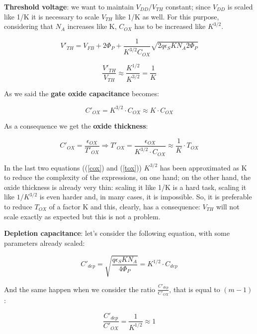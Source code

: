 \documentclass[a4paper, 12pt, twoside, openright]{report}
\begin{document}
\begin{enumerate}
\textbf{Threshold voltage}: we want to maintain $V_{DD}/V_{TH}$ constant; since $V_{DD}$ is scaled like 1/K it is necessary to scale $V_{TH}$ like 1/K as well. For this purpose, considering that $N_{A}$ increases like K, $C_{OX}$ has to be increased like $K^{3/2}$.

	\begin{equation}
	V'_{TH} = V_{FB} + 2\Phi_P + \frac{1}{K^{3/2} C_{OX}} \sqrt{2q \epsilon_S K N_A 2\Phi_P}
	\end{equation}
	
	\begin{equation}
	\frac{V'_{TH}}{V_{TH}} \approx \frac{K^{1/2}} {K^{3/2}} = \frac{1}{K}
	\end{equation}

As we said the \textbf{gate oxide capacitance} becomes:

	\begin{equation}
	C'_{OX} = K^{3/2} \cdot C_{OX}  \approx K \cdot C_{OX}
	\label{cox}
	\end{equation}

As a consequence we get the \textbf{oxide thickness}:

	\begin{equation}
	C'_{OX} = \frac{\epsilon_{OX}}{T'_{OX}} \Rightarrow T'_{OX} = \frac{\epsilon_{OX}}{K^{3/2} \cdot C_{OX}} \approx \frac{1}{K} \cdot T_{OX}
	\label{tox}
	\end{equation}

In the last two equations ((\ref{cox}) and (\ref{tox})) $K^{3/2}$ has been approximated as K to reduce the complexity of the expressions, on one hand; on the other hand, the oxide thickness is already very thin: scaling it like 1/K is a hard task, scaling it like $1/K^{3/2}$ is even harder and, in many cases, it is impossible. So, it is preferable to reduce $T_{OX}$ of a factor K and this, clearly, has a consequence: $V_{TH}$ will not scale exactly as expected but this is not a problem.

\textbf{Depletion capacitance}: let's consider the following equation, with some parameters already scaled:

	\begin{equation}
	C'_{dep} = \sqrt{\frac{q \epsilon_S K N_A}{4 \Phi_P}} = K^{1/2} \cdot C_{dep} 
	\label{}
	\end{equation}

And the same happen when we consider the ratio $\frac{C'_{dep}}{C'_{OX}}$, that is equal to $(m - 1)$:

	\begin{equation}
	\frac{C'_{dep}}{C'_{OX}} = \frac{1}{K^{1/2}} \approx 1
	\label{}
	\end{equation}


\end{enumerate}
\end{document}
